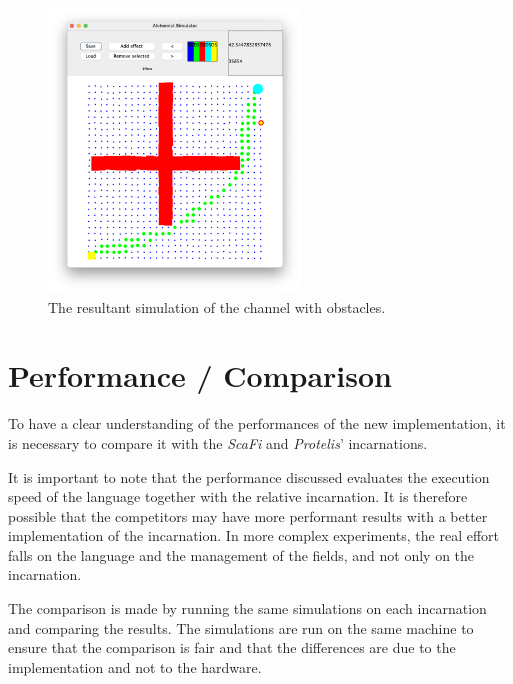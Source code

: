 \begin{figure}[ht!]
    \centering
    \includegraphics[width=0.6\textwidth]{figures/channel}
    \caption{The resultant simulation of the channel with obstacles.}
    \label{fig:channel}
\end{figure}

\section{Performance / Comparison}
\label{sec:performance-/-comparison}
To have a clear understanding of the performances of the new implementation, it is necessary to compare it with the
\emph{ScaFi} and \emph{Protelis}' incarnations.

It is important to note that the performance discussed evaluates the execution speed of the language together with
the relative incarnation.
It is therefore possible that the competitors may have more performant results with a better implementation of the incarnation.
In more complex experiments, the real effort falls on the language and the management of the fields, and not only on the incarnation.

The comparison is made by running the same simulations on each incarnation and comparing the results.
The simulations are run on the same machine to ensure that the comparison is fair and that the differences are due to the
implementation and not to the hardware.

